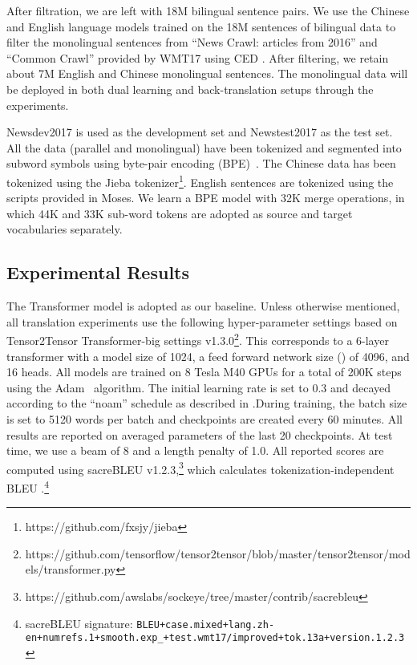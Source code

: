 \documentclass[a4paper]{article}
\begin{document}
\begin{CJK*}{UTF8}{gbsn}
After filtration, we are left with 18M bilingual sentence pairs. We use the Chinese and English language models trained on the 18M sentences of bilingual data to filter the monolingual sentences from ``News Crawl: articles from 2016'' and ``Common Crawl'' provided by WMT17 using CED \cite{Moorelewis}. After filtering, we retain about 7M English and Chinese monolingual sentences. The monolingual data will be deployed in both dual learning and back-translation setups through the experiments.


Newsdev2017 is used as the development set and Newstest2017 as the test set. 
All the data (parallel and monolingual) have been tokenized and segmented into subword symbols using byte-pair encoding (BPE)~\cite{sennrich2015neural}.
The Chinese data has been tokenized using the Jieba tokenizer\footnote{https://github.com/fxsjy/jieba}. English sentences are tokenized using the scripts provided in Moses. We learn a BPE model  with 32K merge operations, in which 44K and 33K sub-word tokens are adopted as source and target vocabularies separately. 
 





\subsection{Experimental Results}

The Transformer model \cite{Vaswani2017AttentionIA} is adopted as our baseline.
Unless otherwise mentioned, all translation experiments use the following hyper-parameter settings based on Tensor2Tensor Transformer-big settings v1.3.0\footnote{https://github.com/tensorflow/tensor2tensor/blob/master/tensor2tensor/models/transformer.py}. This corresponds to a 6-layer transformer with a model size of 1024, a feed forward network size () of 4096, and 16 heads. All models are trained on 8 Tesla M40 GPUs for a total of 200K steps using the Adam~\cite{Kingma2014AdamAM} algorithm. The initial learning rate is set to 0.3 and decayed according to the ``noam'' schedule as described in \cite{Vaswani2017AttentionIA}.During training, the batch size is set to 5120 words per batch and checkpoints are created every 60 minutes. All  results are reported on averaged parameters of the last 20 checkpoints. At test time, we use a beam of 8 and a length penalty of 1.0. All reported scores are computed using sacreBLEU v1.2.3,\footnote{https://github.com/awslabs/sockeye/tree/master/contrib/sacrebleu} which calculates tokenization-independent BLEU \cite{papineni2002bleu}.\footnote{sacreBLEU signature: \texttt{BLEU+case.mixed+lang.zh-en+numrefs.1+smooth.exp\_+test.wmt17/improved+tok.13a+version.1.2.3}}


\end{CJK*}
\end{document}
